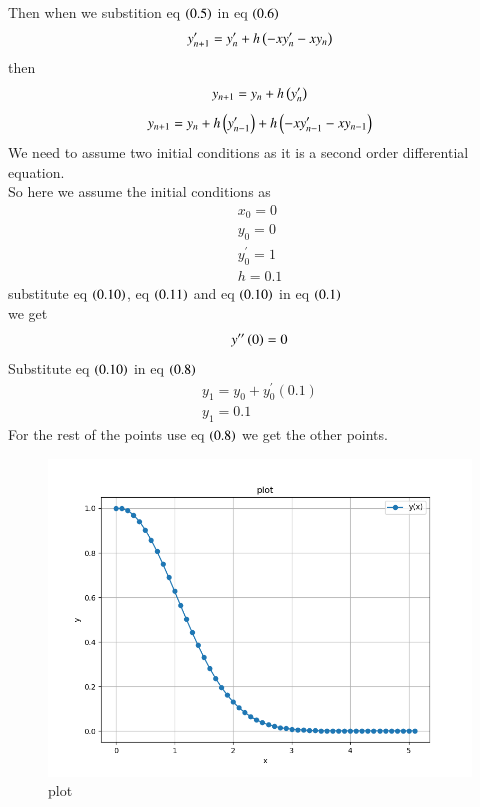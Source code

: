 \documentclass[journal]{IEEEtran}
\begin{document}
  Then when we substition eq $\left(0.5\right)$ in eq $\left(0.6\right)$
\begin{align}
    y^{\prime}_{n+1}=y^{\prime}_{n}+h\left(-x y^{\prime}_{n}-xy_{n}\right)
\end{align}
then 
\begin{align}
    y_{n+1}=y_{n}+h\left(y^{\prime}_{n}\right)
\end{align}
\begin{align}
  y_{n+1}=y_{n}+h\left(y^{\prime}_{n-1}\right)+h\left(-xy^{\prime}_{n-1}-xy_{n-1}\right)
\end{align}
We need to assume two initial conditions as it is a second order differential equation. \\So here we assume the initial conditions as 
\begin{align}
    x_0=0\\y_0=0\\y^\prime_0=1\\h=0.1
\end{align}
substitute eq $\left(0.10\right)$, eq $\left(0.11\right)$ and eq $\left(0.10\right)$ in eq $\left(0.1\right)$\\ we get 
\begin{align}
    y^{\prime\prime}\left(0\right)=0
\end{align}
Substitute eq $\left(0.10\right)$ in eq $\left(0.8\right)$
\begin{align}
    y_1=y_0+y^\prime_0(0.1)\\
    y_1=0.1
\end{align}
For the rest of the points use eq $\left(0.8\right)$ we get the other points.

 \begin{figure}[h!]
    \centering
    \includegraphics[width=1\columnwidth]{figure/fig.png} 
    \caption{plot}
    \label{stemplot}
 \end{figure}
\end{document}
